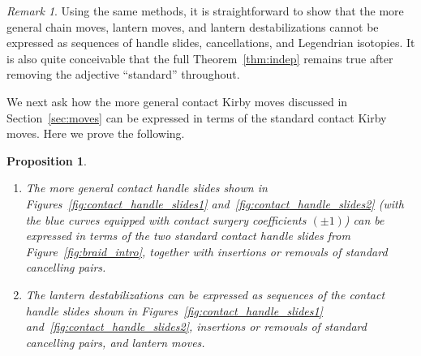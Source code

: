\documentclass{amsart}
\numberwithin{equation}{section}
\numberwithin{figure}{section}
\newtheorem{proposition}[theorem]{Proposition}
\theoremstyle{definition}
\theoremstyle{remark}
\newtheorem{remark}[theorem]{Remark}
\begin{document}
\begin{remark}
Using the same methods, it is straightforward to show that the more general chain moves, lantern moves, and lantern destabilizations cannot be expressed as sequences of handle slides, cancellations, and Legendrian isotopies. It is also quite conceivable that the full Theorem~\ref{thm:indep} remains true after removing the adjective ``standard'' throughout. 
\end{remark}

We next ask how the more general contact Kirby moves discussed in Section~\ref{sec:moves} can be expressed in terms of the standard contact Kirby moves. Here we prove the following.

\begin{proposition}\label{prop:relations_known_moves}\hfill
\begin{enumerate}
    \item The more general contact handle slides shown in Figures~\ref{fig:contact_handle_slides1} and~\ref{fig:contact_handle_slides2} (with the blue curves equipped with contact surgery coefficients $(\pm1)$) can be expressed in terms of the two standard contact handle slides from Figure~\ref{fig:braid_intro}, together with insertions or removals of standard cancelling pairs.
    \item The lantern destabilizations can be expressed as sequences of the contact handle slides shown in Figures~\ref{fig:contact_handle_slides1} and~\ref{fig:contact_handle_slides2}, insertions or removals of standard cancelling pairs, and lantern moves.
\end{enumerate}
\end{proposition}
\end{document}
